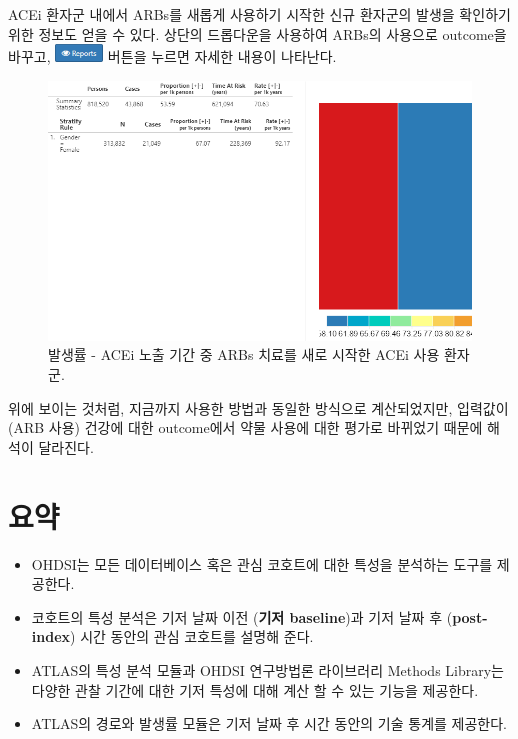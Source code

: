 \documentclass[10.5pt]{book}
\theoremstyle{definition}
\theoremstyle{definition}
\theoremstyle{definition}
\theoremstyle{remark}
\let\BeginKnitrBlock\begin \let\EndKnitrBlock\end
\begin{document}
ACEi 환자군 내에서 ARBs를 새롭게 사용하기 시작한 신규 환자군의 발생을
확인하기 위한 정보도 얻을 수 있다. 상단의 드롭다운을 사용하여 ARBs의
사용으로 outcome을 바꾸고,
\includegraphics{images/Characterization/atlasIncidenceReportButton.png}
버튼을 누르면 자세한 내용이 나타난다.

\begin{figure}

{\centering \includegraphics[width=1\linewidth]{images/Characterization/atlasIncidenceResultsARB} 

}

\caption{발생률 - ACEi 노출 기간 중 ARBs 치료를 새로 시작한 ACEi 사용 환자군.}\label{fig:atlasIncidenceResultsARB}
\end{figure}

위에 보이는 것처럼, 지금까지 사용한 방법과 동일한 방식으로 계산되었지만,
입력값이 (ARB 사용) 건강에 대한 outcome에서 약물 사용에 대한 평가로
바뀌었기 때문에 해석이 달라진다.

\section{요약}\label{-9}

\BeginKnitrBlock{rmdsummary}
\begin{itemize}
\item
  OHDSI는 모든 데이터베이스 혹은 관심 코호트에 대한 특성을 분석하는
  도구를 제공한다.
\item
  코호트의 특성 분석은 기저 날짜 이전 (\textbf{기저 baseline})과 기저
  날짜 후 (\textbf{post-index}) 시간 동안의 관심 코호트를 설명해 준다.
\item
  ATLAS의 특성 분석 모듈과 OHDSI 연구방법론 라이브러리 Methods Library는
  다양한 관찰 기간에 대한 기저 특성에 대해 계산 할 수 있는 기능을
  제공한다.
\item
  ATLAS의 경로와 발생률 모듈은 기저 날짜 후 시간 동안의 기술 통계를
  제공한다.
\end{itemize}
\EndKnitrBlock{rmdsummary}
\end{document}
